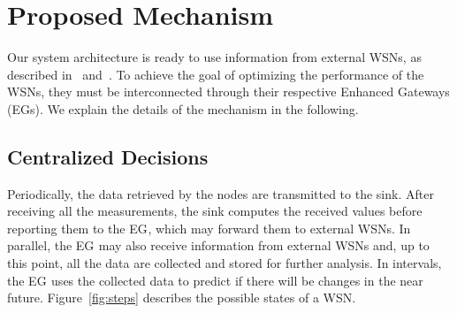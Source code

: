 \documentclass{llncs}
\newcommand{\EG}[1]{EG$_{\text{#1}}$}
\begin{document}
\begin{comment}
\subsection{Increasing the WSNs' lifetime}

Randomly turning off nodes to save energy is a naive solution that may result 
in missing relevant information about the environment. Instead, the system must 
measure how relevant the data provided by each node is, and use that information 
to choose the nodes that will be turned off to operate the WSN correctly when 
saving energy. This involves attending minimal requirements, such as covering 
certain areas and having a minimum number of measurements per area. Besides 
measuring and keeping the quality of the measurements, updates in the WSN 
operation must be applied at the right time in order to optimally react to the 
predicted situations.

Differently from the other challenges, this one also exists in the 
intra-network collaboration (described in Section~\ref{sec:related-work}), and 
existing solutions there may help to solve this issue.
\end{comment}



\section{Proposed Mechanism}
\label{sec:simulations}

Our system architecture is ready to use information from external WSNs, as 
described in~\cite{Pal2012} and~\cite{OechsnerVisions2014}.
To achieve the goal of optimizing the performance of the WSNs, they must be 
interconnected through their respective Enhanced Gateways (EGs). 
We explain the details of the mechanism in the following.





\subsection{Centralized Decisions}
\label{section:predictions}

Periodically, the data retrieved by the nodes are transmitted to the sink. 
After receiving all the measurements, the sink computes
the received values before reporting them to the \EG{}, which may forward them 
to external WSNs. In parallel, the \EG{} may also receive information from 
external WSNs and, up to this point, all the data are collected and stored for 
further analysis. In intervals, the \EG{} uses the collected data to predict if 
there will be changes in the near future. Figure~\ref{fig:steps} describes the 
possible states of a WSN. 
\end{document}
